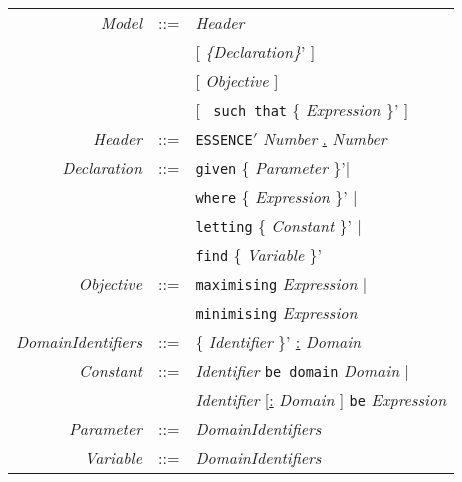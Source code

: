 \documentclass{article}
\begin{document}
\begin{tabular}{rcl}

\textit{Model} & ::= & \textit{Header}\\
               &     & [ \textit{ \{Declaration\}}' ] \\
               &     & [ \textit{Objective} ] \\
               &     & [ \texttt{ such that} \{ \textit{Expression} \}' ] \\

 \textit{Header}& ::= & \texttt{ESSENCE}\underline{$'$} \textit{Number} \underline{.} \textit{Number} \\

\textit{Declaration} & ::= & \texttt{given} \{ \textit{Parameter} \}'$\mid$ \\
                     &     & \texttt{where} \{ \textit{Expression} \}' $\mid$ \\
                     &     & \texttt{letting} \{ \textit{Constant} \}' $\mid$\\
                     &     & \texttt{find} \{ \textit{Variable} \}'\\

\textit{Objective} & ::= & \texttt{maximising} \textit{Expression} $\mid$ \\
                   &     & \texttt{minimising} \textit{Expression} \\

\textit{DomainIdentifiers} & ::= & \{ \textit{Identifier} \}' \underline{:} \textit{Domain} \\

\textit{Constant}  & ::=  & \textit{Identifier}  \texttt{be domain} \textit{Domain} $\mid$ \\
                           & & \textit{Identifier} [\underline{:} \textit{Domain} ] \texttt{be} \textit{Expression} \\
\textit{Parameter} & ::= & \textit{DomainIdentifiers} \\
\textit{Variable}  & ::= & \textit{DomainIdentifiers}\\ 

\end{tabular}
\end{document}
